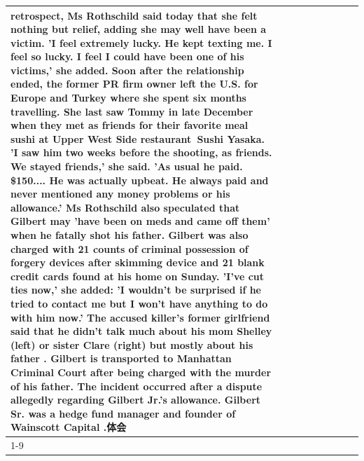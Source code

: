 \begin{table}[H]
\begin{tabular}{lllrlllll}
retrospect, Ms Rothschild said today that she felt nothing but relief, adding she may well have been a victim. 'I feel extremely lucky. He kept texting me. I feel so lucky. I feel I could have been one of his victims,' she added. Soon after the relationship ended, the former PR firm owner left the U.S. for Europe and Turkey where she spent six months  travelling. She last saw Tommy in late December when they met as friends for their favorite meal sushi at Upper West Side restaurant Sushi Yasaka. 'I saw him two weeks before the shooting, as friends. We stayed friends,' she said. 'As usual he paid. \$150.... He was actually upbeat. He always paid and never mentioned any money problems or his allowance.' Ms Rothschild also speculated that Gilbert may 'have been on meds and came off them' when he fatally shot his father. Gilbert was also charged with 21 counts of criminal possession of forgery devices after skimming device and 21 blank credit cards found at his home on Sunday. 'I've cut ties now,' she added: 'I wouldn’t be surprised if he tried to contact me but I won’t have anything to do with him now.' The accused killer's former girlfriend said that he didn't talk much about his mom Shelley (left) or sister Clare (right) but mostly about his father . Gilbert is transported to Manhattan Criminal Court  after being charged with the murder of his father. The incident occurred after a dispute allegedly regarding Gilbert Jr.'s allowance. Gilbert Sr. was a hedge fund manager and founder of Wainscott Capital .体会 \\
\cline{1-9} \cline{2-9}

\end{tabular}
\end{table}
